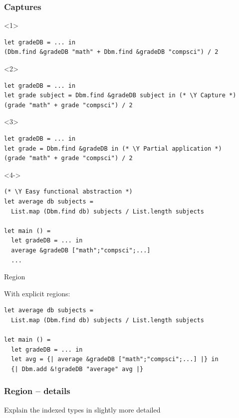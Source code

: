\documentclass[aspectratio=169,dvipsnames,svgnames,10pt]{beamer}
\newcommand\Y{{\color{Green}{\ding{52}}}}
\begin{document}
\begin{frame}[fragile]
  \frametitle{Captures}
  \begin{onlyenv}<1>
\begin{verbatim}
let gradeDB = ... in
(Dbm.find &gradeDB "math" + Dbm.find &gradeDB "compsci") / 2
\end{verbatim}
  \end{onlyenv}
  \begin{onlyenv}<2>
\begin{verbatim}
let gradeDB = ... in
let grade subject = Dbm.find &gradeDB subject in (* \Y Capture *)
(grade "math" + grade "compsci") / 2
\end{verbatim}
  \end{onlyenv}
  \begin{onlyenv}<3>
\begin{verbatim}
let gradeDB = ... in
let grade = Dbm.find &gradeDB in (* \Y Partial application *)
(grade "math" + grade "compsci") / 2
\end{verbatim}
  \end{onlyenv}
  \begin{onlyenv}<4->
\begin{verbatim}
(* \Y Easy functional abstraction *)
let average db subjects = 
  List.map (Dbm.find db) subjects / List.length subjects

let main () =
  let gradeDB = ... in
  average &gradeDB ["math";"compsci";...]
  ...
\end{verbatim}
  \end{onlyenv}
\end{frame}


\begin{frame}[fragile]{Region}

With explicit regions:
  
\begin{verbatim}
let average db subjects = 
  List.map (Dbm.find db) subjects / List.length subjects

let main () =
  let gradeDB = ... in
  let avg = {| average &gradeDB ["math";"compsci";...] |} in
  {| Dbm.add &!gradeDB "average" avg |}
\end{verbatim}
   
\end{frame}

\begin{frame}
  \frametitle{Region -- details}
  Explain the indexed types in slightly more detailed
\end{frame}
\end{document}

